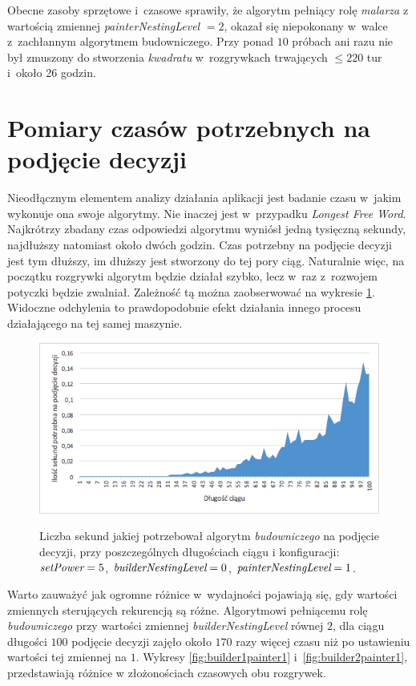 \documentclass[document]{xmgr}
\begin{document}
Obecne zasoby sprzętowe i~czasowe sprawiły, że algorytm pełniący rolę \emph{malarza} z wartością zmiennej \emph{painterNestingLevel} $=2$, okazał się niepokonany w~walce z~zachłannym algorytmem budowniczego. Przy ponad $10$ próbach ani razu nie był zmuszony do stworzenia \emph{kwadratu} w~rozgrywkach trwających $\leq 220$ tur i~około 26 godzin.



\section{Pomiary czasów potrzebnych na podjęcie decyzji}
Nieodłącznym elementem analizy działania aplikacji jest badanie czasu w~jakim wykonuje ona swoje algorytmy. Nie inaczej jest w~przypadku \emph{Longest Free Word}. Najkrótrzy zbadany czas odpowiedzi algorytmu wyniósł jedną tysięczną sekundy, najdłuższy natomiast około dwóch godzin. Czas potrzebny na podjęcie decyzji jest tym dłuższy, im dłuższy jest stworzony do tej pory ciąg. Naturalnie więc, na początku rozgrywki algorytm będzie działał szybko, lecz w~raz z~rozwojem potyczki będzie zwalniał. Zależność tą można zaobserwować na wykresie \ref{fig:builder0painter1}. Widoczne odchylenia to prawdopodobnie efekt działania innego procesu działającego na tej samej maszynie.

\begin{figure}[tbh]
    \centering
    \caption{Liczba sekund jakiej potrzebował algorytm \emph{budowniczego} na podjęcie decyzji, przy poszczególnych długościach ciągu i konfiguracji: $\emph{setPower}=5$, $\emph{builderNestingLevel}=0$, $\emph{painterNestingLevel}=1$.}
    \includegraphics[width = \textwidth]{images2/timeBuilder0Painter1}
    \label{fig:builder0painter1}
\end{figure}

\newpage
Warto zauważyć jak ogromne różnice w~wydajności pojawiają się, gdy wartości zmiennych sterujących rekurencją są różne. Algorytmowi pełniącemu rolę \emph{budowniczego} przy wartości zmiennej \emph{builderNestingLevel} równej $2$, dla ciągu długości $100$ podjęcie decyzji zajęło około $170$ razy więcej czasu niż po ustawieniu wartości tej zmiennej na $1$. Wykresy \ref{fig:builder1painter1} i~\ref{fig:builder2painter1}, przedstawiają różnice w złożonościach czasowych obu rozgrywek.
\end{document}
